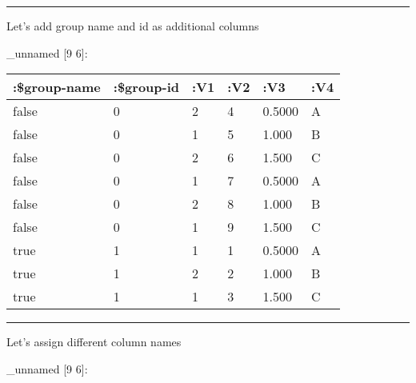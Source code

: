 \documentclass[]{article}
\newenvironment{Shaded}{\begin{snugshade}}{\end{snugshade}}
\newcommand{\KeywordTok}[1]{\textcolor[rgb]{0.13,0.29,0.53}{\textbf{#1}}}
\newcommand{\DecValTok}[1]{\textcolor[rgb]{0.00,0.00,0.81}{#1}}
\newcommand{\StringTok}[1]{\textcolor[rgb]{0.31,0.60,0.02}{#1}}
\newcommand{\VariableTok}[1]{\textcolor[rgb]{0.00,0.00,0.00}{#1}}
\newcommand{\AttributeTok}[1]{\textcolor[rgb]{0.77,0.63,0.00}{#1}}
\newcommand{\NormalTok}[1]{#1}
\begin{document}
\begin{center}\rule{0.5\linewidth}{0.5pt}\end{center}

Let's add group name and id as additional columns

\begin{Shaded}
\end{Shaded}

\_unnamed {[}9 6{]}:

\begin{longtable}[]{@{}llllll@{}}
\toprule
:\$group-name & :\$group-id & :V1 & :V2 & :V3 & :V4\tabularnewline
\midrule
\endhead
false & 0 & 2 & 4 & 0.5000 & A\tabularnewline
false & 0 & 1 & 5 & 1.000 & B\tabularnewline
false & 0 & 2 & 6 & 1.500 & C\tabularnewline
false & 0 & 1 & 7 & 0.5000 & A\tabularnewline
false & 0 & 2 & 8 & 1.000 & B\tabularnewline
false & 0 & 1 & 9 & 1.500 & C\tabularnewline
true & 1 & 1 & 1 & 0.5000 & A\tabularnewline
true & 1 & 2 & 2 & 1.000 & B\tabularnewline
true & 1 & 1 & 3 & 1.500 & C\tabularnewline
\bottomrule
\end{longtable}

\begin{center}\rule{0.5\linewidth}{0.5pt}\end{center}

Let's assign different column names

\begin{Shaded}
\end{Shaded}

\_unnamed {[}9 6{]}:
\end{document}
